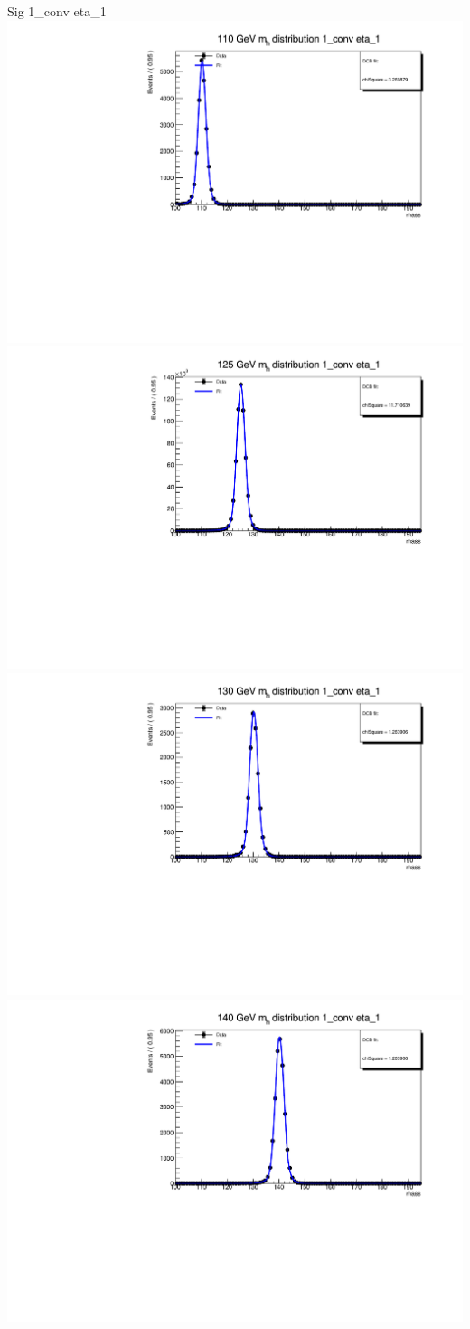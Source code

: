 \documentclass[10pt,UKenglish, leqno, xcolor = dvipsnames]{beamer}
\begin{document}
		\begin{frame}{Sig 1\_conv eta\_1}
			\vfill
			\centering
			\includegraphics[width=.45\textwidth]{../images/week_10/PowhegPy8_NNLOPS_ggH110_1_conv_eta_1_fit.pdf}
			\includegraphics[width=.45\textwidth]{../images/week_10/PowhegPy8_NNLOPS_ggH125_1_conv_eta_1_fit.pdf}\\
			\includegraphics[width=.45\textwidth]{../images/week_10/PowhegPy8_NNLOPS_ggH130_1_conv_eta_1_fit.pdf}
			\includegraphics[width=.45\textwidth]{../images/week_10/PowhegPy8_NNLOPS_ggH140_1_conv_eta_1_fit.pdf}
			\vfill
		\end{frame}
	
\end{document}
